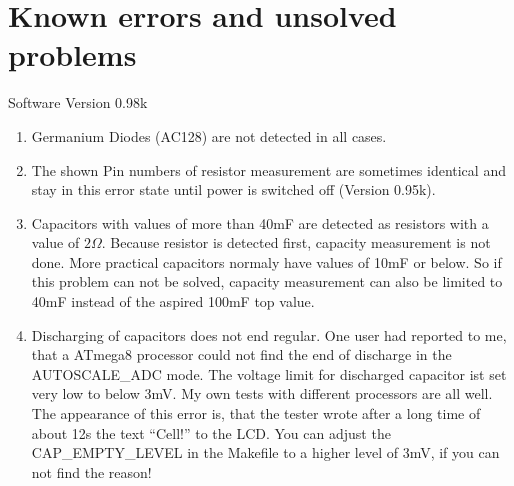 
\chapter{Known errors and unsolved problems}
{\center Software Version 0.98k}

\begin{enumerate}
\item Germanium Diodes (AC128) are not detected in all cases.
\item The shown Pin numbers of resistor measurement are sometimes identical and stay in this error state until power is switched off
(Version 0.95k).
\item Capacitors with values of more than 40mF are detected as resistors with a value of \(2\Omega\).
Because resistor is detected first, capacity measurement is not done. More practical capacitors normaly have
values of 10mF or below. So if this problem can not be solved, capacity measurement can also be limited to
40mF instead of the aspired 100mF top value.
\item Discharging of capacitors does not end regular. One user had reported to me, that a ATmega8 processor could not
find the end of discharge in the AUTOSCALE\_ADC mode.
The voltage limit for discharged capacitor ist set very low to below 3mV. My own tests with different processors are all well.
The appearance of this error is, that the tester wrote after a long time of about 12s the text ``Cell!'' to the LCD.
You can adjust the CAP\_EMPTY\_LEVEL in the Makefile to a higher level of 3mV, if you can not find the reason!

\end{enumerate}
